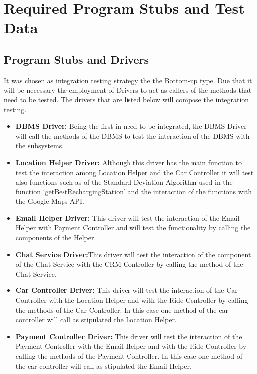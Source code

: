 \documentclass[a4paper]{article}
\begin{document}
\section{Required Program Stubs and Test Data}

\subsection{Program Stubs and Drivers}
It was chosen as integration testing strategy the the Bottom-up type. Due that it will be necessary the employment of Drivers to act as callers of the methods that need to be tested. The drivers that are listed below will compose the integration testing.
\begin{itemize}
\item \textbf{DBMS Driver:} Being the first in need to be integrated, the DBMS Driver will call the methods of the DBMS to test the interaction of the DBMS with the subsystems.

\item \textbf{Location Helper Driver:} Although this driver has the main function to test the interaction among Location Helper and the Car Controller it will test also functions such as of the Standard Deviation Algorithm used in the function ‘getBestRechargingStation’ and the interaction of the functions with the Google Maps API.

\item \textbf{Email Helper Driver:} This driver will test the interaction of the Email Helper with Payment Controller and will test the functionality by calling the components of the Helper.

\item \textbf{Chat Service Driver:}This driver will test the interaction of the component of the Chat Service with the CRM Controller by calling the method of the Chat Service.

\item \textbf{Car Controller Driver:} This driver will test the interaction of the  Car Controller with the Location Helper and with the Ride Controller by calling the methods of the Car Controller. In this case one method of the car controller will call as stipulated the Location Helper.  

\item \textbf{Payment Controller Driver:} This driver will test the interaction of the Payment Controller with the Email Helper and with the Ride Controller by calling the methods of the Payment Controller. In this case one method of the car controller will call as stipulated the Email Helper.  


\end{itemize}
\end{document}
